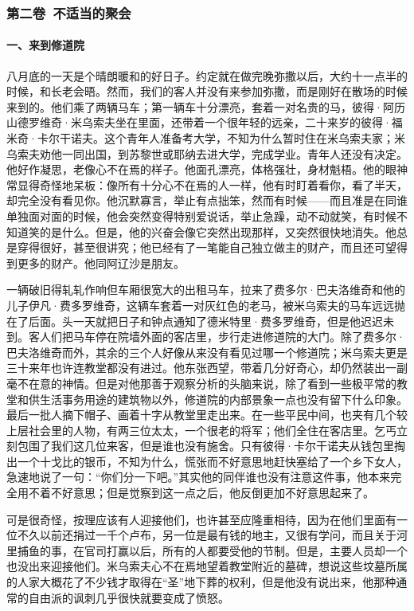 \subsubsection*{第二卷\ 不适当的聚会}

\paragraph*{一、来到修道院}
\par 八月底的一天是个晴朗暖和的好日子。约定就在做完晚弥撒以后，大约十一点半的时候，和长老会晤。然而，我们的客人并没有来参加弥撒，而是刚好在散场的时候来到的。他们乘了两辆马车；第一辆车十分漂亮，套着一对名贵的马，彼得·阿历山德罗维奇·米乌索夫坐在里面，还带着一个很年轻的远亲，二十来岁的彼得·福米奇·卡尔干诺夫。这个青年人准备考大学，不知为什么暂时住在米乌索夫家；米乌索夫劝他一同出国，到苏黎世或耶纳去进大学，完成学业。青年人还没有决定。他好作凝思，老像心不在焉的样子。他面孔漂亮，体格强壮，身材魁梧。他的眼神常显得奇怪地呆板：像所有十分心不在焉的人一样，他有时盯着看你，看了半天，却完全没有看见你。他沉默寡言，举止有点拙笨，然而有时候——而且准是在同谁单独面对面的时候，他会突然变得特别爱说话，举止急躁，动不动就笑，有时候不知道笑的是什么。但是，他的兴奋会像它突然出现那样，又突然很快地消失。他总是穿得很好，甚至很讲究；他已经有了一笔能自己独立做主的财产，而且还可望得到更多的财产。他同阿辽沙是朋友。
\par 一辆破旧得轧轧作响但车厢很宽大的出租马车，拉来了费多尔·巴夫洛维奇和他的儿子伊凡·费多罗维奇，这辆车套着一对灰红色的老马，被米乌索夫的马车远远抛在了后面。头一天就把日子和钟点通知了德米特里·费多罗维奇，但是他迟迟未到。客人们把马车停在院墙外面的客店里，步行走进修道院的大门。除了费多尔·巴夫洛维奇而外，其余的三个人好像从来没有看见过哪一个修道院；米乌索夫更是三十来年也许连教堂都没有进过。他东张西望，带着几分好奇心，却仍然装出一副毫不在意的神情。但是对他那善于观察分析的头脑来说，除了看到一些极平常的教堂和供生活事务用途的建筑物以外，修道院的内部景象一点也没有留下什么印象。最后一批人摘下帽子、画着十字从教堂里走出来。在一些平民中间，也夹有几个较上层社会里的人物，有两三位太太，一个很老的将军；他们全住在客店里。乞丐立刻包围了我们这几位来客，但是谁也没有施舍。只有彼得·卡尔干诺夫从钱包里掏出一个十戈比的银币，不知为什么，慌张而不好意思地赶快塞给了一个乡下女人，急速地说了一句：“你们分一下吧。”其实他的同伴谁也没有注意这件事，他本来完全用不着不好意思；但是觉察到这一点之后，他反倒更加不好意思起来了。
\par 可是很奇怪，按理应该有人迎接他们，也许甚至应隆重相待，因为在他们里面有一位不久以前还捐过一千个卢布，另一位是最有钱的地主，又很有学问，而且关于河里捕鱼的事，在官司打赢以后，所有的人都要受他的节制。但是，主要人员却一个也没出来迎接他们。米乌索夫心不在焉地望着教堂附近的墓碑，想说这些坟墓所属的人家大概花了不少钱才取得在“圣”地下葬的权利，但是他没有说出来，他那种通常的自由派的讽刺几乎很快就要变成了愤怒。
